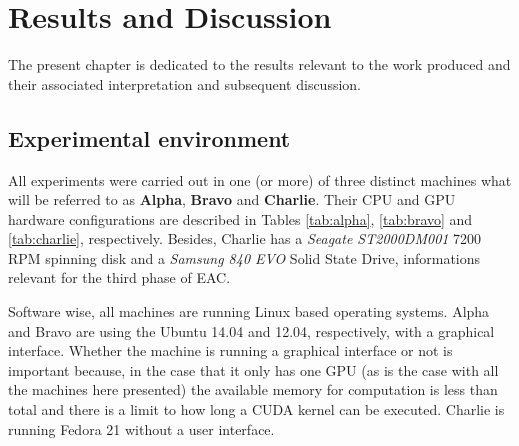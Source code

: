 
\chapter{Results and Discussion}
\label{chapter:results}

The present chapter is dedicated to the results relevant to the work produced and their associated interpretation and subsequent discussion.

%

%
%

\section{Experimental environment}
\label{sec:system configs}

All experiments were carried out in one (or more) of three distinct machines what will be referred to as \textbf{Alpha}, \textbf{Bravo} and \textbf{Charlie}.
Their CPU and GPU hardware configurations are described in Tables \ref{tab:alpha}, \ref{tab:bravo} and \ref{tab:charlie}, respectively.
Besides, Charlie has a \emph{Seagate ST2000DM001} 7200 RPM spinning disk and a \emph{Samsung 840 EVO} Solid State Drive, informations relevant for the third phase of EAC.%

Software wise, all machines are running Linux based operating systems.
Alpha and Bravo are using the Ubuntu 14.04 and 12.04, respectively, with a graphical interface.
Whether the machine is running a graphical interface or not is important because, in the case that it only has one GPU (as is the case with all the machines here presented) the available memory for computation is less than total and there is a limit to how long a CUDA kernel can be executed.
Charlie is running Fedora 21 without a user interface.







